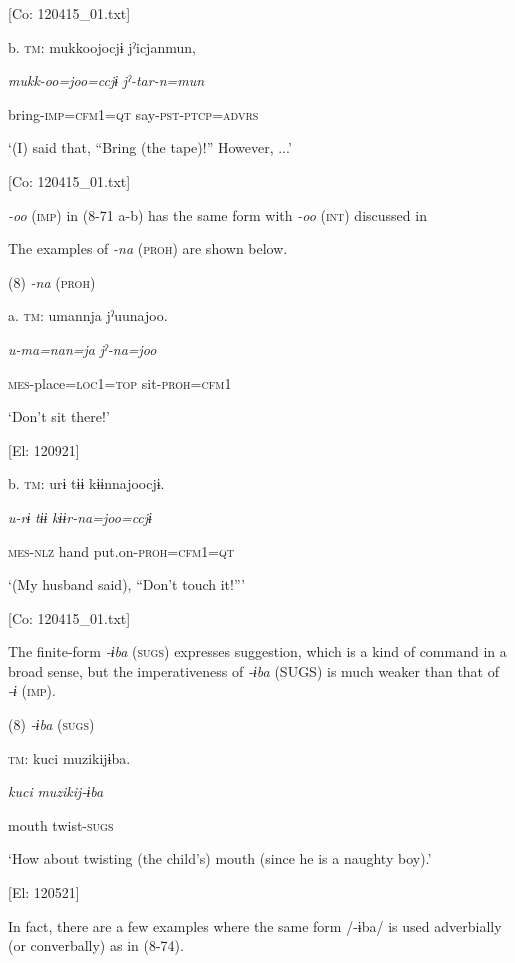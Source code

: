       [Co: 120415\_01.txt]

  b.  \textsc{tm}:  mukkoojocjɨ  jˀicjanmun,

      \textit{mukk-oo=joo=ccjɨ}  \textit{jˀ-tar-n=mun}

      bring-\textsc{imp}=\textsc{cfm}1=\textsc{qt}  say-\textsc{pst}-\textsc{ptcp}=\textsc{advrs}

      ‘(I) said that, “Bring (the tape)!” However, ...’

      [Co: 120415\_01.txt]

\textit{{}-oo} (\textsc{imp}) in (8-71 a-b) has the same form with \textit{-oo} (\textsc{int}) discussed in 

  The examples of \textit{{}-na} (\textsc{proh}) are shown below.

(8)  \textit{{}-na} (\textsc{proh})

  a.  \textsc{tm}:  umannja  jˀuunajoo.

      \textit{u-ma=nan=ja}  \textit{jˀ-na=joo}

      \textsc{mes}-place=\textsc{loc}1=\textsc{top}  sit-\textsc{proh}=\textsc{cfm}1

      ‘Don’t sit there!’

      [El: 120921]

  b.  \textsc{tm}:  urɨ  tɨɨ  kɨɨnnajoocjɨ.

      \textit{u-rɨ}  \textit{tɨɨ}  \textit{kɨɨr-na=joo=ccjɨ}

      \textsc{mes}-\textsc{nlz}  hand  put.on-\textsc{proh}=\textsc{cfm}1=\textsc{qt}

      ‘(My husband said), “Don’t touch it!”’

      [Co: 120415\_01.txt]

  The finite-form \textit{{}-ɨba} (\textsc{sugs}) expresses suggestion, which is a kind of command in a broad sense, but the imperativeness of \textit{{}-ɨba} (SUGS) is much weaker than that of \textit{{}-ɨ} (\textsc{imp}).

(8)  \textit{{}-ɨba} (\textsc{sugs})

  \textsc{tm}:  kuci  muzikijɨba.

    \textit{kuci}  \textit{muzikij-ɨba}

    mouth  twist-\textsc{sugs}

    ‘How about twisting (the child’s) mouth (since he is a naughty boy).’

    [El: 120521]

In fact, there are a few examples where the same form /-ɨba/ is used adverbially (or converbally) as in (8-74).

